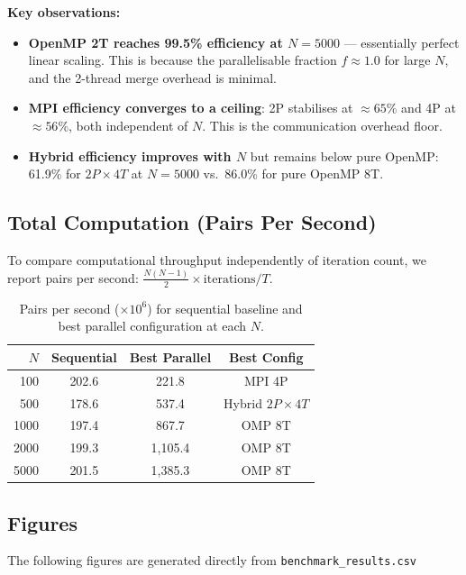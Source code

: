 ﻿\documentclass[12pt,a4paper]{article}
\begin{document}
\noindent\textbf{Key observations:}
\begin{itemize}
    \item \textbf{OpenMP 2T reaches 99.5\% efficiency at $N=5000$} ---
          essentially perfect linear scaling. This is because the
          parallelisable fraction $f \approx 1.0$ for large $N$, and the
          2-thread merge overhead is minimal.
    \item \textbf{MPI efficiency converges to a ceiling}: 2P stabilises at
          $\approx 65\%$ and 4P at $\approx 56\%$, both independent of $N$.
          This is the communication overhead floor.
    \item \textbf{Hybrid efficiency improves with $N$} but remains below
          pure OpenMP: 61.9\% for $2P \times 4T$ at $N=5000$ vs.\ 86.0\%
          for pure OpenMP 8T.
\end{itemize}

\subsection{Total Computation (Pairs Per Second)}

To compare computational throughput independently of iteration count, we
report pairs per second: $\frac{N(N-1)}{2} \times \text{iterations} / T$.

\begin{table}[H]
\centering
\caption{Pairs per second ($\times 10^6$) for sequential baseline and best
         parallel configuration at each $N$.}
\begin{tabular}{rccc}
    \toprule
    $N$ & Sequential & Best Parallel & Best Config \\
    \midrule
    100  & 202.6 & 221.8   & MPI 4P \\
    500  & 178.6 & 537.4   & Hybrid $2P{\times}4T$ \\
    1000 & 197.4 & 867.7   & OMP 8T \\
    2000 & 199.3 & 1{,}105.4 & OMP 8T \\
    5000 & 201.5 & 1{,}385.3 & OMP 8T \\
    \bottomrule
\end{tabular}
\end{table}

\subsection{Figures}

The following figures are generated directly from
\texttt{benchmark\_results.csv}
\end{document}

